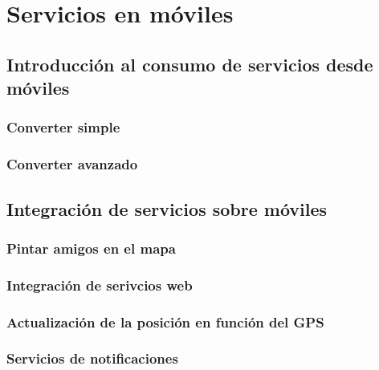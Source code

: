 \chapter{Servicios en móviles}\label{chap:7}
\section{Introducción al consumo de servicios desde móviles}
\subsection{Converter simple}

\subsection{Converter avanzado}

\section{Integración de servicios sobre móviles}

\subsection{Pintar amigos en el mapa}

\subsection{Integración de serivcios web}

\subsection{Actualización de la posición en función del GPS}

\subsection{Servicios de notificaciones}
